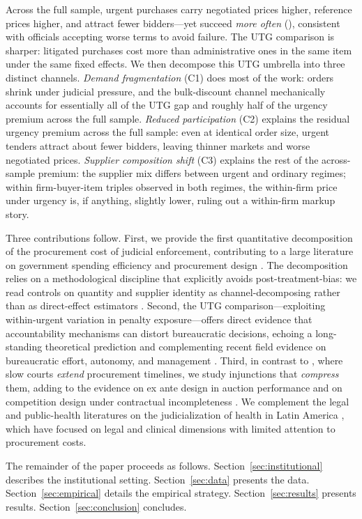 Across the full sample, urgent purchases carry negotiated prices \BPnegPctHeadline{} higher, reference prices \BPrefPctPreferred{} higher, and attract \BPfirmsPctHeadline{} fewer bidders---yet succeed \textit{more often} (\BPsuccessPP), consistent with officials accepting worse terms to avoid failure. The UTG comparison is sharper: litigated purchases cost \BPutgPctRange{} more than administrative ones in the same item under the same fixed effects. We then decompose this UTG umbrella into three distinct channels. \textit{Demand fragmentation} (C1) does most of the work: orders shrink under judicial pressure, and the bulk-discount channel mechanically accounts for essentially all of the UTG gap and roughly half of the urgency premium across the full sample. \textit{Reduced participation} (C2) explains the residual urgency premium across the full sample: even at identical order size, urgent tenders attract about \BPfirmsPanelBpct{} fewer bidders, leaving thinner markets and worse negotiated prices. \textit{Supplier composition shift} (C3) explains the rest of the across-sample premium: the supplier mix differs between urgent and ordinary regimes; within firm-buyer-item triples observed in both regimes, the within-firm price under urgency is, if anything, slightly lower, ruling out a within-firm markup story.

Three contributions follow. First, we provide the first quantitative decomposition of the procurement cost of judicial enforcement, contributing to a large literature on government spending efficiency and procurement design \citep{bandiera2009active, best2023procurement, decarolis2018buyer, lewisfaupel2016can, szucs2024discretion}. The decomposition relies on a methodological discipline that explicitly avoids post-treatment-bias: we read controls on quantity and supplier identity as channel-decomposing rather than as direct-effect estimators \citep{acharya2016explaining}. Second, the UTG comparison---exploiting within-urgent variation in penalty exposure---offers direct evidence that accountability mechanisms can distort bureaucratic decisions, echoing a long-standing theoretical prediction \citep{prendergast2007bureaucrats} and complementing recent field evidence on bureaucratic effort, autonomy, and management \citep{rasul2018management, williams2021bureaucratic, bandiera2021allocation}. Third, in contrast to \citet{coviello2018court}, where slow courts \emph{extend} procurement timelines, we study injunctions that \emph{compress} them, adding to the evidence on ex ante design in auction performance \citep{coviello2018bidding, baltrunaite2021discretion} and on competition design under contractual incompleteness \citep{carril2026competition}. We complement the legal and public-health literatures on the judicialization of health in Latin America \citep{wang2015right, ferraz2009right, biehl2009will}, which have focused on legal and clinical dimensions with limited attention to procurement costs.

The remainder of the paper proceeds as follows. Section~\ref{sec:institutional} describes the institutional setting. Section~\ref{sec:data} presents the data. Section~\ref{sec:empirical} details the empirical strategy. Section~\ref{sec:results} presents results. Section~\ref{sec:conclusion} concludes.
